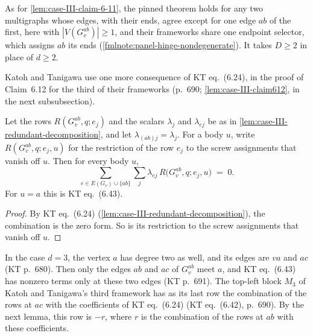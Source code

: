 \begin{fmlnote}
  As for \cref{lem:case-III-claim-6-11}, the pinned theorem holds for
  any two multigraphs whose edges, with their ends, agree except for one
  edge $ab$ of the first, here with $|V(G_v^{ab})| \ge 1$, and their
  frameworks share one endpoint selector, which assigns $ab$ its ends
  (\cref{fmlnote:panel-hinge-nondegenerate}). It takes $D \ge 2$ in
  place of $d \ge 2$.
\end{fmlnote}

Katoh and Tanigawa use one more consequence of KT eq.~(6.24), in the
proof of Claim~6.12 for the third of their frameworks (p.~690;
\cref{lem:case-III-claim612}, in the next subsubsection).

\begin{lemma}
  \label{lem:case-III-acolumn-zero}
  \leanok
  Let the rows $R(G_v^{ab}, q; e_j)$ and the scalars $\lambda_j$ and
  $\lambda_{ej}$ be as in \cref{lem:case-III-redundant-decomposition},
  and let $\lambda_{(ab)j} = \lambda_j$. For a body $u$, write
  $R(G_v^{ab}, q; e_j, u)$ for the restriction of the row $e_j$ to the
  screw assignments that vanish off $u$. Then for every body $u$,
  \[
    \sum_{e \in E(G_v) \cup \{ab\}} \sum_{j}
      \lambda_{ej}\, R\bigl(G_v^{ab}, q; e_j, u\bigr) \;=\; 0 .
  \]
  For $u = a$ this is KT eq.~(6.43).
\end{lemma}
\begin{proof}
  \leanok
  By KT eq.~(6.24) (\cref{lem:case-III-redundant-decomposition}), the
  combination is the zero form. So is its restriction to the screw
  assignments that vanish off $u$.
\end{proof}

In the case $d = 3$, the vertex $a$ has degree two as well, and its
edges are $va$ and $ac$ (KT p.~680). Then only the edges $ab$ and $ac$
of $G_v^{ab}$ meet $a$, and KT eq.~(6.43) has nonzero terms only at
these two edges (KT p.~691). The top-left block $M_3$ of Katoh and Tanigawa's
third framework has as its last row the combination of the rows at $ac$
with the coefficients of KT eq.~(6.24) (KT eq.~(6.42), p.~690). By the
next lemma, this row is $-r$, where $r$ is the combination of the rows
at $ab$ with these coefficients.

